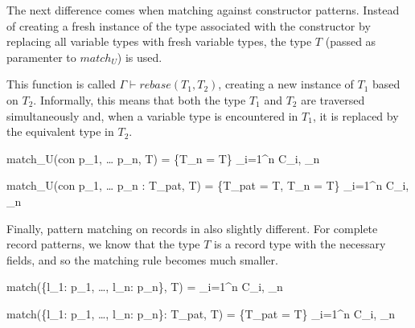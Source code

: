 \documentclass[class=article, crop=false]{standalone}
\begin{document}


\smallskip

The next difference comes when matching against constructor patterns.
Instead of creating a fresh instance of the type associated with the constructor by replacing all variable types with fresh variable types, the type $T$ (passed as paramenter to $match_U$) is used.

This function is called $\Gamma \vdash rebase(T_1, T_2)$, creating a new instance of $T_1$ based on $T_2$.
Informally, this means that both the type $T_1$ and $T_2$ are traversed simultaneously and, when a variable type is encountered in $T_1$, it is replaced by the equivalent type in $T_2$.

    {\Gamma \vdash match_U(con \; p_1, \; \dots \; p_n, T) = \{T_n = T\} \cup \displaystyle \bigcup_{i=1}^{n} C_i, \Gamma_n}

    {\Gamma \vdash match_U(con \; p_1, \; \dots \; p_n : T_{pat}, T) = \{T_{pat} = T, T_n = T\} \cup \displaystyle \bigcup_{i=1}^{n} C_i, \Gamma_n}

Finally, pattern matching on records in also slightly different.
For complete record patterns, we know that the type $T$ is a record type with the necessary fields, and so the matching rule becomes much smaller.

    {match(\{l_1: p_1, \dots, l_n: p_n\}, T) = \displaystyle \bigcup_{i=1}^{n} C_i, \Gamma_n}

    {match(\{l_1: p_1, \dots, l_n: p_n\}: T_{pat}, T) = \{T_{pat} = T\} \cup \displaystyle \bigcup_{i=1}^{n} C_i, \Gamma_n}
\end{document}
